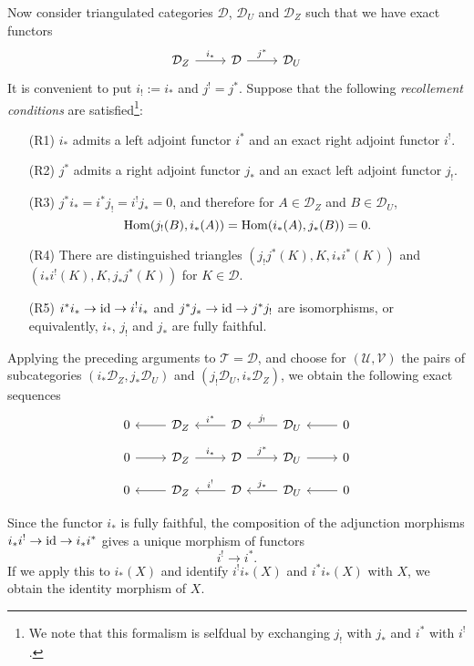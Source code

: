 Now consider triangulated categories $\mathcal{D}$, $\mathcal{D}_U$ and $\mathcal{D}_Z$ such that we have exact functors
\[\begin{tikzcd}
\mathcal{D}_Z\ar[r,"i_*"]&\mathcal{D}\ar[r,"j^*"]&\mathcal{D}_U
\end{tikzcd}\]
It is convenient to put $i_!:=i_*$ and $j^!=j^*$. Suppose that the following \textit{recollement conditions} are satisfied\footnote{We note that this formalism is selfdual by exchanging $j_!$ with $j_*$ and $i^*$ with $i^!$.}:
\begin{enumerate}[leftmargin=40pt]
    \item[(R1)] $i_*$ admits a left adjoint functor $i^*$ and an exact right adjoint functor $i^!$.
    \item[(R2)] $j^*$ admits a right adjoint functor $j_*$ and an exact left adjoint functor $j_!$.
    \item[(R3)] $j^*i_*=i^*j_!=i^!j_*=0$, and therefore for $A\in\mathcal{D}_Z$ and $B\in\mathcal{D}_U$,
    \[\mathrm{Hom}(j_!(B),i_*(A))=\mathrm{Hom}(i_*(A),j_*(B))=0.\]
    \item[(R4)] There are distinguished triangles $(j_!j^*(K),K,i_*i^*(K))$ and $(i_*i^!(K),K,j_*j^*(K))$ for $K\in\mathcal{D}$.
    \item[(R5)] $i^*i_*\to\operatorname{id}\to i^!i_*$ and $j^*j_*\to\operatorname{id}\to j^*j_!$ are isomorphisms, or equivalently, $i_*$, $j_!$ and $j_*$ are fully faithful. 
\end{enumerate}

Applying the preceding arguments to $\mathcal{T}=\mathcal{D}$, and choose for $(\mathcal{U},\mathcal{V})$ the pairs of subcategories $(i_*\mathcal{D}_Z,j_*\mathcal{D}_U)$ and $(j_!\mathcal{D}_U,i_*\mathcal{D}_Z)$, we obtain the following exact sequences
\[\begin{tikzcd}
0&\mathcal{D}_Z\ar[l]&\mathcal{D}\ar[l,swap,"i^*"]&\mathcal{D}_U\ar[l,swap,"j_!"]&0\ar[l]
\end{tikzcd}\]
\vspace*{-4mm}
\[\begin{tikzcd}
0\ar[r]&\mathcal{D}_Z\ar[r,"i_*"]&\mathcal{D}\ar[r,"j^*"]&\mathcal{D}_U\ar[r]&0
\end{tikzcd}\]
\vspace*{-4mm}
\[\begin{tikzcd}
0&\mathcal{D}_Z\ar[l]&\mathcal{D}\ar[l,swap,"i^!"]&\mathcal{D}_U\ar[l,swap,"j_*"]&0\ar[l]
\end{tikzcd}\]

Since the functor $i_*$ is fully faithful, the composition of the adjunction morphisms $i_*i^!\to\operatorname{id}\to i_*i^*$ gives a unique morphism of functors
\begin{equation}\label{triangle cat recollement i^! to i^* morphism}
i^!\to i^*.
\end{equation}
If we apply this to $i_*(X)$ and identify $i^!i_*(X)$ and $i^*i_*(X)$ with $X$, we obtain the identity morphism of $X$.\par

